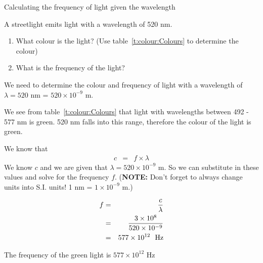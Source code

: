 \begin{wex}{Calculating the frequency of light given the wavelength}
{\begin{minipage}{.8\textwidth}
A streetlight emits light with a wavelength of 520 nm.
\begin{enumerate}
\item What colour is the light? (Use table~\ref{t:colour:Colours} to determine the colour)
\item What is the frequency of the light? 
\end{enumerate}
\end{minipage}
}
{
We need to determine the colour and frequency of light with a wavelength of $\lambda = 520$ nm = $520 \times 10^{-9}$ m.

We see from table~\ref{t:colour:Colours} that light with wavelengths between 492 - 577 nm is green. 520 nm falls into this range, therefore the colour of the light is green.

We know that 
\begin{eqnarray*}
c &=& f \times \lambda 
\end{eqnarray*}
We know $c$ and we are given that $\lambda = 520 \times 10^{-9}$ m. So we can substitute in these values and solve for the frequency $f$.
(\textbf{NOTE:} Don't forget to always change units into S.I. units! 1 nm = $1 \times 10^{-9}$ m.)

\begin{eqnarray*}
f &=& \frac{c}{\lambda} \\
 & = & \frac{3 \times 10^{8}}{520 \times 10^{-9}} \\
 & = & 577 \times 10^{12}~~\rm{Hz}
\end{eqnarray*}

The frequency of the green light is $577 \times 10^{12}$ Hz
}
\end{wex}


